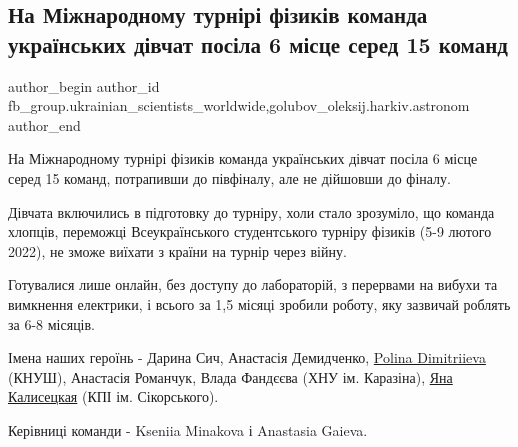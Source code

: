  
 
 
 
 
 
\subsection{На Міжнародному турнірі фізиків команда українських дівчат посіла 6 місце серед 15 команд}
\label{sec:13_05_2022.fb.fb_group.ukrainian_scientists_worldwide.1.turnir_fizykiv_divchata}
 
\ifcmt
 author_begin
   author_id fb_group.ukrainian_scientists_worldwide,golubov_oleksij.harkiv.astronom
 author_end
\fi

На Міжнародному турнірі фізиків команда українських дівчат посіла 6 місце серед
15 команд, потрапивши до півфіналу, але не дійшовши до фіналу.

Дівчата включились в підготовку до турніру, холи стало зрозуміло, що команда
хлопців, переможці Всеукраїнського студентського турніру фізиків (5-9 лютого
2022), не зможе виїхати з країни на турнір через війну. 

Готувалися лише онлайн, без доступу до лабораторій, з перервами на вибухи та
вимкнення електрики, і всього за 1,5 місяці зробили роботу, яку зазвичай
роблять за 6-8 місяців. 

Імена наших героїнь - Дарина Сич, Анастасія Демидченко,
\href{https://www.facebook.com/PolinaDimitriieva}{Polina Dimitriieva} (КНУШ),
Анастасія Романчук, Влада Фандєєва (ХНУ ім. Каразіна),
\href{https://www.facebook.com/profile.php?id=100004338379209}{Яна Калисецкая}
(КПІ ім. Сікорського).

Керівниці команди - Kseniia Minakova і Anastasia Gaieva.

